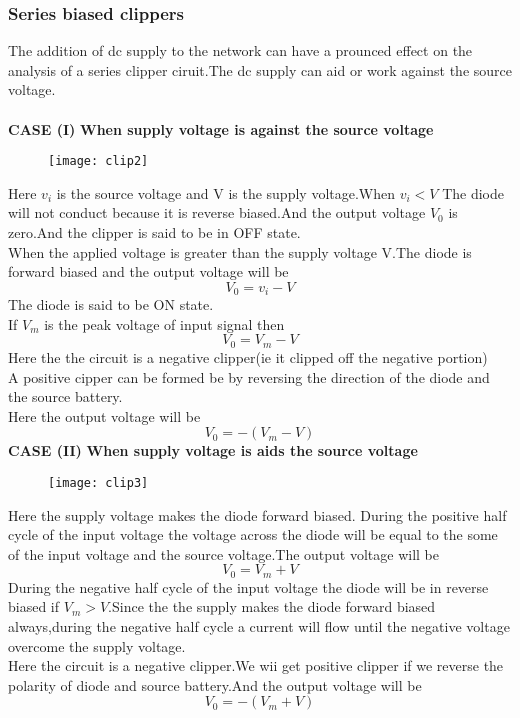 \subsubsection{Series biased clippers} 
The addition of dc supply to the network can have a prounced effect on the analysis of a series clipper ciruit.The dc supply can aid or work against the source voltage.\\\\
\textbf{CASE (I)} \textbf{When supply voltage is against the source voltage}
\begin{figure}[H]
\centering
\texttt{[image: clip2]}
\caption{}
\label{}
\end{figure}
Here $v_{i}$ is the source voltage and V is the supply voltage.When $v_{i}<V$ The diode will not conduct because it is reverse biased.And the output voltage $V_{0}$ is zero.And the clipper is said to be in OFF state.\\
When the applied voltage is greater than the supply voltage V.The diode is forward biased and the output voltage will be 
$$V_{0}=v_{i}-V$$
The diode is said to be ON state.\\
If $V_{m}$ is the peak voltage of input signal then\\
$$V_{0}=V_{m}-V$$
Here the the circuit is a negative clipper(ie it clipped off the negative portion)\\
A positive cipper can be formed be by reversing the direction of the diode and the source battery.\\
Here the output voltage will be \\
$$V_{0}=-(V_{m}-V)$$
\textbf{CASE (II)} \textbf{When supply voltage is aids the source voltage}
\begin{figure}[H]
\centering
\texttt{[image: clip3]}
\caption{}
\label{}
\end{figure}
Here the supply voltage makes the diode forward biased. During the positive half cycle of the input voltage the voltage across the diode will be equal to the some of the input voltage and the source voltage.The output voltage will be 
$$V_{0}=V_{m}+V$$
During the negative half cycle of the input voltage the diode will be in reverse biased if $V_{m}>V$.Since the the supply makes the diode forward biased always,during the negative half cycle a current will flow until the negative voltage overcome the supply voltage.\\
Here the circuit is a negative clipper.We wii get positive clipper  if we reverse the polarity of diode and source battery.And the output voltage will be 
$$V_{0}=-(V_{m}+V)$$
